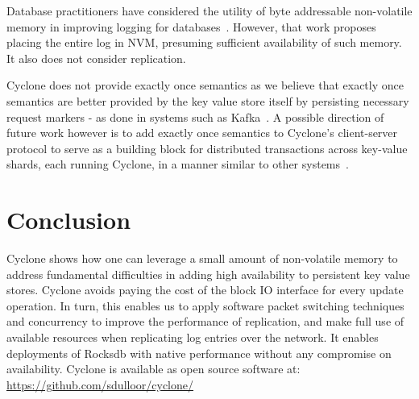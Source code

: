 \documentclass[letterpaper,twocolumn,10pt]{article}
\begin{document}

Database practitioners have considered the utility of byte addressable
non-volatile memory in improving logging for
databases~\cite{nvram_log}. However, that work proposes placing the
entire log in NVM, presuming sufficient availability of such
memory. It also does not consider replication.

Cyclone does not provide exactly once semantics as we believe that
exactly once semantics are better provided by the key value store
itself by persisting necessary request markers - as done in systems
such as Kafka~\cite{kafka}. A possible direction of future work
however is to add exactly once semantics to Cyclone's client-server
protocol to serve as a building block for distributed transactions
across key-value shards, each running Cyclone, in a manner similar to
other systems~\cite{raft_lin}.

\section{Conclusion}
Cyclone shows how one can leverage a small amount of non-volatile
memory to address fundamental difficulties in adding high
availability to persistent key value stores. Cyclone avoids
paying the cost of the block IO interface for every update
operation. In turn, this enables us to apply software packet
switching techniques and concurrency to improve the performance of
replication, and make full use of available resources when
replicating log entries over the network. It enables deployments of
Rocksdb with native performance without any compromise on availability.
Cyclone is available as open source software at:\\
\url{https://github.com/sdulloor/cyclone/}
\newcommand\myurl[2]{\url{#1}}


\end{document}
